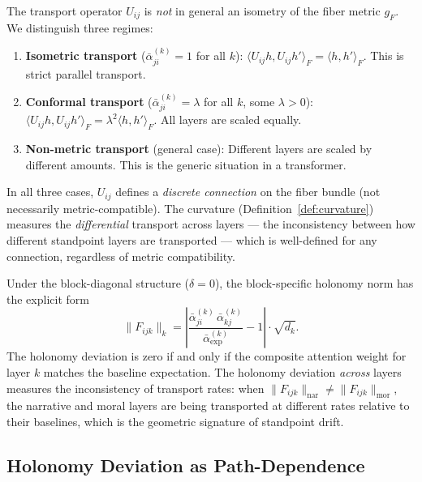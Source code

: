 \begin{remark}
\label{rem:metric-preservation}
The transport operator $U_{ij}$ is \emph{not} in general an isometry of the fiber metric
$g_F$. We distinguish three regimes:
\begin{enumerate}
    \item \textbf{Isometric transport} ($\bar{\alpha}_{ji}^{(k)} = 1$ for all $k$):
    $\langle U_{ij} h, U_{ij} h' \rangle_F = \langle h, h' \rangle_F$. This is strict
    parallel transport.
    \item \textbf{Conformal transport} ($\bar{\alpha}_{ji}^{(k)} = \lambda$ for all $k$,
    some $\lambda > 0$): $\langle U_{ij} h, U_{ij} h' \rangle_F = \lambda^2 \langle h, h'
    \rangle_F$. All layers are scaled equally.
    \item \textbf{Non-metric transport} (general case): Different layers are scaled by
    different amounts. This is the generic situation in a transformer.
\end{enumerate}
In all three cases, $U_{ij}$ defines a \emph{discrete connection} on the fiber bundle
(not necessarily metric-compatible). The curvature (Definition~\ref{def:curvature})
measures the \emph{differential} transport across layers --- the inconsistency between
how different standpoint layers are transported --- which is well-defined for any
connection, regardless of metric compatibility.
\end{remark}

\begin{proposition}
\label{prop:curvature-inconsistency}
Under the block-diagonal structure ($\delta = 0$), the block-specific holonomy norm has
the explicit form
\[
    \|F_{ijk}\|_k = \left|\frac{\bar{\alpha}_{ji}^{(k)}\, \bar{\alpha}_{kj}^{(k)}}
    {\bar{\alpha}^{(k)}_{\exp}} - 1\right| \cdot \sqrt{d_k}.
\]
The holonomy deviation is zero if and only if the composite attention weight for layer $k$ matches
the baseline expectation. The holonomy deviation \emph{across} layers measures the inconsistency of
transport rates: when $\|F_{ijk}\|_{\mathrm{nar}} \neq \|F_{ijk}\|_{\mathrm{mor}}$, the
narrative and moral layers are being transported at different rates relative to their
baselines, which is the geometric signature of standpoint drift.
\end{proposition}

\subsection{Holonomy Deviation as Path-Dependence}
\label{sec:curvature}

